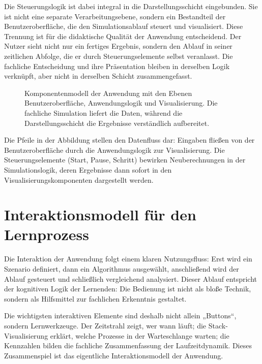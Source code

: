 Die Steuerungslogik ist dabei integral in die Darstellungsschicht eingebunden. Sie ist nicht eine separate Verarbeitungsebene, sondern ein Bestandteil der Benutzeroberfläche, die den Simulationsablauf steuert und visualisiert. Diese Trennung ist für die didaktische Qualität der Anwendung entscheidend. Der Nutzer sieht nicht nur ein fertiges Ergebnis, sondern den Ablauf in seiner zeitlichen Abfolge, die er durch Steuerungselemente selbst veranlasst. Die fachliche Entscheidung und ihre Präsentation bleiben in derselben Logik verknüpft, aber nicht in derselben Schicht zusammengefasst.

\begin{figure}[htbp]
    \centering
    
    \caption{Komponentenmodell der Anwendung mit den Ebenen Benutzeroberfläche, Anwendungslogik und Visualisierung. Die fachliche Simulation liefert die Daten, während die Darstellungsschicht die Ergebnisse verständlich aufbereitet.}
    \label{fig:komponentenmodell}
\end{figure}

Die Pfeile in der Abbildung stellen den Datenfluss dar: Eingaben fließen von der Benutzeroberfläche durch die Anwendungslogik zur Visualisierung. Die Steuerungselemente (Start, Pause, Schritt) bewirken Neuberechnungen in der Simulationslogik, deren Ergebnisse dann sofort in den Visualisierungskomponenten dargestellt werden.



\section{Interaktionsmodell für den Lernprozess}

Die Interaktion der Anwendung folgt einem klaren Nutzungsfluss: Erst wird ein Szenario definiert, dann ein Algorithmus ausgewählt, anschließend wird der Ablauf gesteuert und schließlich vergleichend analysiert. Dieser Ablauf entspricht der kognitiven Logik der Lernenden: Die Bedienung ist nicht als bloße Technik, sondern als Hilfsmittel zur fachlichen Erkenntnis gestaltet.

Die wichtigsten interaktiven Elemente sind deshalb nicht allein „Buttons“, sondern Lernwerkzeuge. Der Zeitstrahl zeigt, wer wann läuft; die Stack-Visualisierung erklärt, welche Prozesse in der Warteschlange warten; die Kennzahlen bilden die fachliche Zusammenfassung der Laufzeitdynamik. Dieses Zusammenspiel ist das eigentliche Interaktionsmodell der Anwendung.

